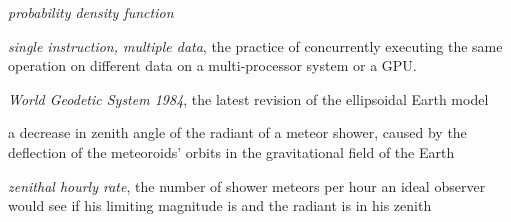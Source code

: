 \begin{description}[labelindent=0mm, leftmargin=40mm]
    \item[PDF]
        \emph{probability density function} 
    \item[SIMD]
        \emph{single instruction, multiple data}, the practice of concurrently executing the same operation on
        different data on a multi-processor system or a GPU.
    \item[WGS84]
        \emph{World Geodetic System 1984}, the latest revision of the ellipsoidal Earth model \citep{nima-wgs84}
    \item[zenith attraction]
        a decrease in zenith angle of the radiant of a meteor shower, caused by the deflection of the meteoroids' orbits in the
        gravitational field of the Earth \citep{lovell1954}
    \item[ZHR]
        \emph{zenithal hourly rate}, the number of shower meteors per hour an ideal observer would see
            if his limiting magnitude is  and the radiant is in his zenith \citep{imo-glossary}
\end{description}
